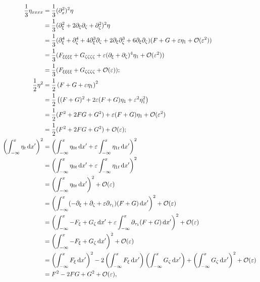 \documentclass[10pt,reqno,oneside,a4paper]{article}
\begin{document}
\begin{align*}
\frac{1}{3}\eta_{xxxx} &=\frac{1}{3} (\partial_x^2)^2 \eta \\
&=\frac{1}{3} (\partial_\xi^2 + 2\partial_\xi\partial_\zeta + \partial_\zeta^2 )^2 \eta \\
&=\frac{1}{3} (\partial_\xi^4 + \partial_\zeta^4 +  4\partial_\xi^3\partial_\zeta+  2\partial_\xi\partial_\zeta^3 + 6\partial_\xi\partial_\zeta) (F + G + \varepsilon \eta_1 + \mathcal{O}(\varepsilon^2)) \\
&= \frac{1}{3}(F_{\xi\xi\xi\xi} + G_{\zeta\zeta\zeta\zeta} + \varepsilon (\partial_\xi + \partial_\zeta)^4 \eta_1 + \mathcal{O}(\varepsilon^2)) \\
&= \frac{1}{3}(F_{\xi\xi\xi\xi} + G_{\zeta\zeta\zeta\zeta} + \mathcal{O}(\varepsilon)); \\
\frac{1}{2}\eta^2 &= \frac{1}{2} \left( F+G + \varepsilon \eta_1 \right)^2 \\
&=  \frac{1}{2} \left( (F+G)^2 + 2\varepsilon(F+G)\eta_1 + \varepsilon^2 \eta_1^2 \right) \\
&=  \frac{1}{2} (F^2 + 2FG +G^2) + \varepsilon(F+G)\eta_1 + \mathcal{O}(\varepsilon^2) \\
&= \frac{1}{2} (F^2 + 2FG +G^2) + \mathcal{O}(\varepsilon); \\
\left( \int^{x}_{-\infty} \eta_t \,\mathrm{d} x' \right)^2 &= \left( \int^{x}_{-\infty} \eta_{0t} \,\mathrm{d} x' + \varepsilon\int^{x}_{-\infty}  \eta_{1t} \,\mathrm{d} x' \right)^2 \\
&= \left( \int^{x}_{-\infty} \eta_{0t} \,\mathrm{d} x' + \varepsilon\int^{x}_{-\infty} \eta_{1t} \,\mathrm{d} x' \right)^2 \\
&= \left( \int^{x}_{-\infty} \eta_{0t} \,\mathrm{d} x' \right)^2 + \mathcal{O}(\varepsilon) \\
&= \left( \int^{x}_{-\infty}(-\partial_\xi + \partial_\zeta + \varepsilon \partial_{\tau_1}) (F+G) \,\mathrm{d} x' \right)^2 + \mathcal{O}(\varepsilon)\\ 
&=  \left( \int^{x}_{-\infty}-F_\xi + G_\zeta \,\mathrm{d} x' + \varepsilon \int^{x}_{-\infty} \partial_{\tau_1} (F+G) \,\mathrm{d} x' \right)^2 + \mathcal{O}(\varepsilon) \\
&= \left( \int^{x}_{-\infty}-F_\xi + G_\zeta \,\mathrm{d} x' \right)^2 + \mathcal{O}(\varepsilon)\\
&= \left( \int^{x}_{-\infty}F_\xi \,\mathrm{d} x'\right)^2 - 2\left( \int^{x}_{-\infty}F_\xi \,\mathrm{d} x'\right)\left( \int^{x}_{-\infty}G_\zeta \,\mathrm{d} x'\right) + \left( \int^{x}_{-\infty} G_\zeta \,\mathrm{d} x'\right)^2 + \mathcal{O}(\varepsilon) \\
&= F^2 - 2FG + G^2 + \mathcal{O}(\varepsilon),
\end{align*}
\end{document}

